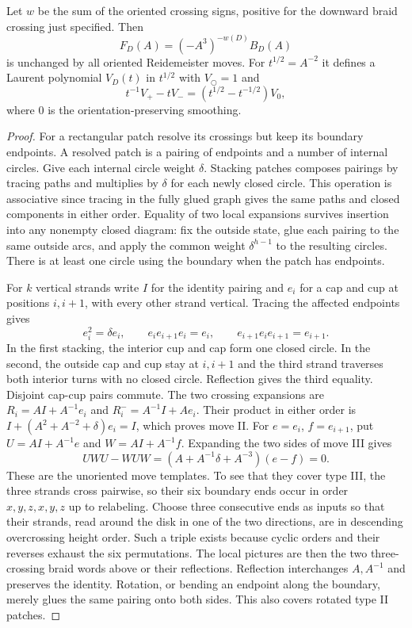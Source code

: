 \begin{theorem}
Let $w$ be the sum of the oriented crossing signs, positive for the
downward braid crossing just specified. Then
\[
 F_D(A)=(-A^3)^{-w(D)}B_D(A)
\]
is unchanged by all oriented Reidemeister moves. For
$t^{1/2}=A^{-2}$ it defines a Laurent polynomial $V_D(t)$ in $t^{1/2}$
with $V_{\bigcirc}=1$ and
\[
 t^{-1}V_{+}-t V_{-}=(t^{1/2}-t^{-1/2})V_{0},
\]
where $0$ is the orientation-preserving smoothing.
\end{theorem}
\begin{proof}
For a rectangular patch resolve its crossings but keep its boundary
endpoints. A resolved patch is a pairing of endpoints and a number of
internal circles. Give each internal circle weight $\delta$. Stacking
patches composes pairings by tracing paths and multiplies by $\delta$ for
each newly closed circle. This operation is associative since tracing in the
fully glued graph gives the same paths and closed components in either
order. Equality of two local expansions survives insertion into any
nonempty closed diagram: fix the outside state, glue each pairing to the
same outside arcs, and apply the common weight $\delta^{h-1}$ to the
resulting circles. There is at least one circle using the boundary when the
patch has endpoints.

For $k$ vertical strands write $I$ for the identity pairing and $e_i$ for a
cap and cup at positions $i,i+1$, with every other strand vertical.
Tracing the affected endpoints gives
\[
 e_i^2=\delta e_i,\qquad
 e_i e_{i+1}e_i=e_i,\qquad e_{i+1}e_ie_{i+1}=e_{i+1}.
\]
In the first stacking, the interior cup and cap form one closed circle. In
the second, the outside cap and cup stay at $i,i+1$ and the third strand
traverses both interior turns with no closed circle. Reflection gives the
third equality. Disjoint cap-cup pairs commute. The two crossing
expansions are $R_i=AI+A^{-1}e_i$ and $R_i^{-}=A^{-1}I+Ae_i$.
Their product in either order is
$I+(A^2+A^{-2}+\delta)e_i=I$, which proves move II. For $e=e_i$, $f=e_{i+1}$, put $U=AI+A^{-1}e$ and $W=AI+A^{-1}f$. Expanding the two sides of move III gives
\[
 UWU-WUW=(A+A^{-1}\delta+A^{-3})(e-f)=0 .
\]
These are the unoriented move templates. To see that they cover type III,
the three strands cross pairwise, so their six boundary ends occur in
order $x,y,z,x,y,z$ up to relabeling. Choose three consecutive ends as
inputs so that their strands, read around the disk in one of the two
directions, are in descending overcrossing height order. Such a triple
exists because cyclic orders and their reverses exhaust the six
permutations. The local pictures are then the two three-crossing braid
words above or their reflections. Reflection interchanges $A,A^{-1}$
and preserves the identity. Rotation, or bending an endpoint along the
boundary, merely glues the same pairing onto both sides. This also covers
rotated type II patches.


\end{proof}
